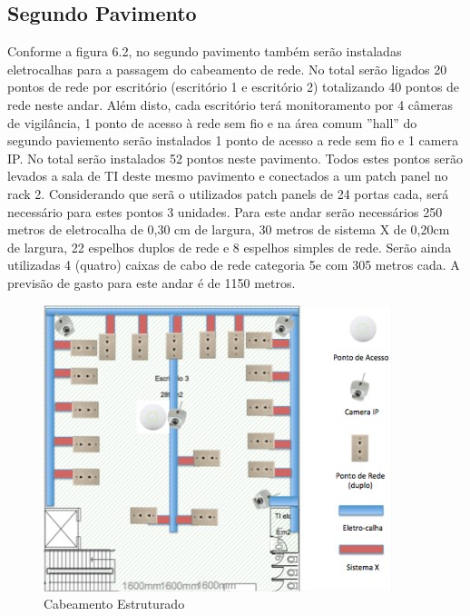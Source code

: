 \documentclass[	DIV=calc,%
							paper=a4,%
							fontsize=12pt,%
							onecolumn]{scrartcl}	 					%
\begin{document}
\subsection{Segundo Pavimento}
{\raggedright Conforme a figura 6.2, no segundo pavimento também serão instaladas eletrocalhas para a
passagem do cabeamento de rede. No total serão ligados 20 pontos de rede por escritório
(escritório 1 e escritório 2) totalizando 40 pontos de rede neste andar. Além disto, cada
escritório terá monitoramento por 4 câmeras de vigilância, 1 ponto de acesso à rede sem
fio e na área comum ”hall” do segundo paviemento serão instalados 1 ponto de acesso a
rede sem fio e 1 camera IP. No total serão instalados 52 pontos neste pavimento.
Todos estes pontos serão levados a sala de TI deste mesmo pavimento e conectados
a um patch panel no rack 2.
Considerando que serã o utilizados patch panels de 24 portas cada, será necessário
para estes pontos 3 unidades.
Para este andar serão necessários 250 metros de eletrocalha de 0,30 cm de largura,
30 metros de sistema X de 0,20cm de largura, 22 espelhos duplos de rede e 8 espelhos
simples de rede.
Serão ainda utilizadas 4 (quatro) caixas de cabo de rede categoria 5e com 305
metros cada. A previsão de gasto para este andar é de 1150 metros.
}
\begin{figure}[H]
  \centering
  \includegraphics[width=\textwidth]{piso22} 
  \caption{Cabeamento Estruturado}
  \label{fig:methodology}
\end{figure}
\end{document}
